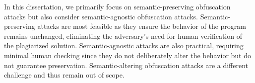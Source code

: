 In this dissertation, we primarily focus on semantic-preserving obfuscation attacks but also consider semantic-agnostic obfuscation attacks.
Semantic-preserving attacks are most feasible as they ensure the behavior of the program remains unchanged, eliminating the adversary's need for human verification of the plagiarized solution. Semantic-agnostic attacks are also practical, requiring minimal human checking since they do not deliberately alter the behavior but do not guarantee preservation.
Semantic-altering obfuscation attacks are a different challenge and thus remain out of scope.
